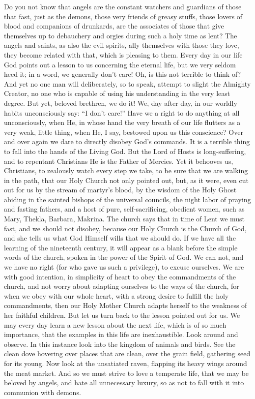 Do you not know that angels are the constant 
watchers and guardians of those that fast, just 
as the demons, those very friends of greasy 
stuffs, those lovers of blood and companions of 
drunkards, are the associates of those that give 
themselves up to debauchery and orgies during 
such a holy time as lent? The angels and saints, 
as also the evil spirits, ally themselves with 
those they love, they become related with that, 
which is pleasing to them. Every day in our 
life God points out a lesson to us concerning 
the eternal life, but we very seldom heed it; 
in a word, we generally don't care! Oh, is this 
not terrible to think of? And yet no one man 
will deliberately, so to speak, attempt to slight 
the Almighty Creator, no one who is capable of 
using his understanding in the very least degree.
But yet, beloved brethren, we do it! 
We, day after day, in our worldly habits unconsciously
say: ``I don't care!'' Have we a right 
to do anything at all unconsciously, when He, 
in whose hand the very breath of our life 
flutters as a very weak, little thing, when He, 
I say, bestowed upon us this conscience? Over 
and over again we dare to directly disobey 
God's commands. It is a terrible thing to fall 
into the hands of the Living God. But the 
Lord of Hosts is long-suffering, and to repentant
Christians He is the Father of Mercies. 
Yet it behooves us, Christians, to zealously 
watch every step we take, to be sure that we are 
walking in the path, that our Holy Church not 
only pointed out, but, as it were, even cut out 
for us by the stream of martyr's blood, by the 
wisdom of the Holy Ghost abiding in the 
sainted bishops of the universal councils, the 
night labor of praying and fasting fathers, and 
a host of pure, self-sacrificing, obedient women, 
such as Mary, Thekla, Barbara, Makrina. The 
church says that in time of Lent we must fast,
and we should not disobey, because our Holy 
Church is the Church of God, and she tells us 
what God Himself wills that we should do. If 
we have all the learning of the nineteenth century,
it will appear as a blank before the simple 
words of the church, spoken in the power of the 
Spirit of God. We can not, and we have no 
right (for who gave us such a privilege), to 
excuse ourselves. We are with good intention,
in simplicity of heart to obey the commandments
of the church, and not worry about 
adapting ourselves to the ways of the church, 
for when we obey with our whole heart, with a 
strong desire to fulfill the holy commandments,
then our Holy Mother Church adapts 
herself to the weakness of her faithful children. 
But let us turn back to the lesson pointed out 
for us. We may every day learn a new lesson 
about the next life, which is of so much importance,
that the examples in this life are inexhaustible.
Look around and observe. In this 
instance look into the kingdom of animals and 
birds. See the clean dove hovering over places 
that are clean, over the grain field, gathering 
seed for its young. Now look at the unsatiated 
raven, flapping its heavy wings around the meat 
market. And so we must strive to love a
temperate life, that we may be beloved by 
angels, and hate all unnecessary luxury, so as 
not to fall with it into communion with demons.

